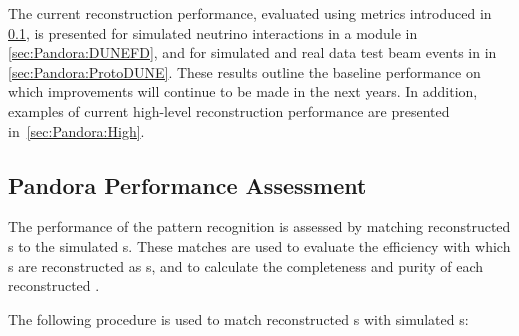The current reconstruction performance, evaluated using metrics introduced in \ref{sec:Pandora:assessment}, is presented for simulated neutrino interactions in a \single \nominalmodsize {} module in \ref{sec:Pandora:DUNEFD}, and for simulated and real data test beam events in  in \ref{sec:Pandora:ProtoDUNE}. These results outline the baseline performance on which improvements will continue to be made in the next years. In addition, examples of current high-level reconstruction performance are presented in~\ref{sec:Pandora:High}.

\subsection{Pandora Performance Assessment}
\label{sec:Pandora:assessment}
The performance of the  pattern recognition is assessed by matching reconstructed s to the simulated s. These matches are used to evaluate the efficiency with which s are reconstructed as s, and to calculate the completeness and purity of each reconstructed . 


The following procedure is used to match reconstructed s with simulated s:

